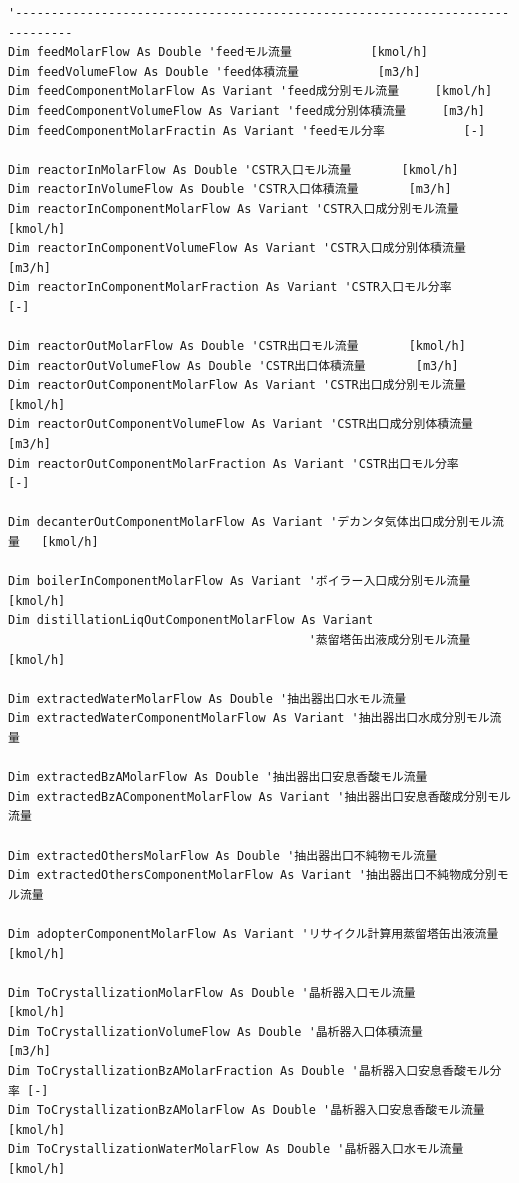 \documentclass[a4j]{jsreport}
\begin{document}
\begin{lstlisting}[caption=HYSYSとpythonを繋ぐコード]
'------------------------------------------------------------------------------
Dim feedMolarFlow As Double 'feedモル流量           [kmol/h]
Dim feedVolumeFlow As Double 'feed体積流量           [m3/h]
Dim feedComponentMolarFlow As Variant 'feed成分別モル流量     [kmol/h]
Dim feedComponentVolumeFlow As Variant 'feed成分別体積流量     [m3/h]
Dim feedComponentMolarFractin As Variant 'feedモル分率           [-]

Dim reactorInMolarFlow As Double 'CSTR入口モル流量       [kmol/h]
Dim reactorInVolumeFlow As Double 'CSTR入口体積流量       [m3/h]
Dim reactorInComponentMolarFlow As Variant 'CSTR入口成分別モル流量 [kmol/h]
Dim reactorInComponentVolumeFlow As Variant 'CSTR入口成分別体積流量 [m3/h]
Dim reactorInComponentMolarFraction As Variant 'CSTR入口モル分率       [-]

Dim reactorOutMolarFlow As Double 'CSTR出口モル流量       [kmol/h]
Dim reactorOutVolumeFlow As Double 'CSTR出口体積流量       [m3/h]
Dim reactorOutComponentMolarFlow As Variant 'CSTR出口成分別モル流量 [kmol/h]
Dim reactorOutComponentVolumeFlow As Variant 'CSTR出口成分別体積流量 [m3/h]
Dim reactorOutComponentMolarFraction As Variant 'CSTR出口モル分率       [-]

Dim decanterOutComponentMolarFlow As Variant 'デカンタ気体出口成分別モル流量   [kmol/h]

Dim boilerInComponentMolarFlow As Variant 'ボイラー入口成分別モル流量   [kmol/h]
Dim distillationLiqOutComponentMolarFlow As Variant
                                          '蒸留塔缶出液成分別モル流量   [kmol/h]

Dim extractedWaterMolarFlow As Double '抽出器出口水モル流量
Dim extractedWaterComponentMolarFlow As Variant '抽出器出口水成分別モル流量

Dim extractedBzAMolarFlow As Double '抽出器出口安息香酸モル流量
Dim extractedBzAComponentMolarFlow As Variant '抽出器出口安息香酸成分別モル流量

Dim extractedOthersMolarFlow As Double '抽出器出口不純物モル流量
Dim extractedOthersComponentMolarFlow As Variant '抽出器出口不純物成分別モル流量

Dim adopterComponentMolarFlow As Variant 'リサイクル計算用蒸留塔缶出液流量 [kmol/h]

Dim ToCrystallizationMolarFlow As Double '晶析器入口モル流量         [kmol/h]
Dim ToCrystallizationVolumeFlow As Double '晶析器入口体積流量         [m3/h]
Dim ToCrystallizationBzAMolarFraction As Double '晶析器入口安息香酸モル分率 [-]
Dim ToCrystallizationBzAMolarFlow As Double '晶析器入口安息香酸モル流量 [kmol/h]
Dim ToCrystallizationWaterMolarFlow As Double '晶析器入口水モル流量       [kmol/h]


\end{lstlisting}
\end{document}
